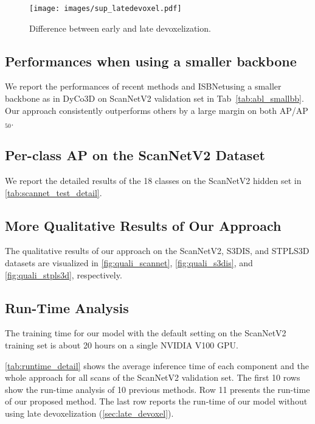 \documentclass[10pt,twocolumn,letterpaper]{article}
\def\Approach{ISBNet}
\begin{document}
\begin{figure}[t]
  \centering
  \texttt{[image: images/sup\_latedevoxel.pdf]}
   \caption{Difference between early and late devoxelization.}
   \label{fig:late_devoxel}
\end{figure}


\subsection{Performances when using a smaller backbone}
\label{sec:small_backbone}
We report the performances of recent methods and \Approach using a smaller backbone as in DyCo3D on ScanNetV2 validation set in Tab~\ref{tab:abl_smallbb}. Our approach consistently outperforms others by a large margin on both AP/AP$_{50}$.

\subsection{Per-class AP on the ScanNetV2 Dataset} 
\label{sec:perclass_scannet}

We report the detailed results of the 18 classes on the ScanNetV2 hidden set in \cref{tab:scannet_test_detail}.

\subsection{More Qualitative Results of Our Approach}
\label{sec:more_qualitative} 

The qualitative results of our approach on the ScanNetV2, S3DIS, and STPLS3D datasets are visualized in \cref{fig:quali_scannet}, \cref{fig:quali_s3dis}, and \cref{fig:quali_stpls3d}, respectively.



\subsection{Run-Time Analysis} 
\label{sec:runtime_analysis}
 The training time for our model with the default setting on the ScanNetV2 \cite{dai2017scannet} training set is about 20 hours on a single NVIDIA V100 GPU.

 \cref{tab:runtime_detail} shows the average inference time of each component and the whole approach for all scans of the ScanNetV2 validation set. The first 10 rows show the run-time analysis of 10 previous methods. Row 11 presents the run-time of our proposed method. The last row reports the run-time of our model without using late devoxelization (\cref{sec:late_devoxel}).
\end{document}
